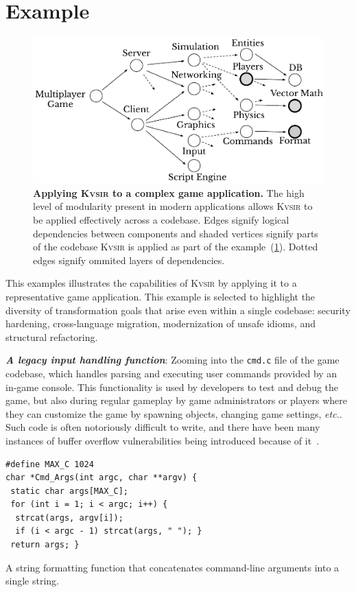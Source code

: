\documentclass[sigplan,review,anonymous,10pt]{acmart}
\def\etc{{\em etc.}\xspace}
\newcommand{\sys}{{\scshape Kv{\textalpha}sir}\xspace}
\newcommand{\heading}[1]{\vspace{2pt}\noindent\textbf{\emph{#1}}:\enspace}
\newcommand{\ttt}[1]{\texttt{#1}\xspace}
\begin{document}
\section{Example}
\label{sec:example}

\begin{figure}[t]
\centering
  \includegraphics[width=.9\columnwidth]{figs/kvasir_application.pdf}
  \caption{\textbf{Applying \sys to a complex game application.}
  The high level of modularity present in modern applications allows \sys to be applied effectively across a codebase.
  Edges signify logical dependencies between components 
  and shaded vertices signify parts of the codebase \sys is applied as part of the example~(\cref{sec:example}).
  Dotted edges signify ommited layers of dependencies.
  }
  \label{fig:ex-large-app}
\end{figure}

This examples illustrates the capabilities of \sys by applying it to a representative game
application.
This example is selected to highlight the
diversity of transformation goals that arise even within a single codebase:
security hardening, cross-language migration, modernization of unsafe idioms,
and structural refactoring.

\heading{A legacy input handling function}
Zooming into the \ttt{cmd.c} file of the game codebase, 
which handles parsing and executing user commands provided by an in-game console.
This functionality is used by developers to test and debug the game, but also during regular gameplay
by game administrators or players where they can customize the game by spawning objects, changing game settings, \etc.
Such code is often notoriously difficult to write,
and there have been many instances of buffer overflow vulnerabilities being introduced because of it~\cite{CVE-2006-3400, CVE-2006-3401, CVE-2007-5248, CVE-2019-1010043}.
\begin{listing}
\begin{verbatim}
#define MAX_C 1024
char *Cmd_Args(int argc, char **argv) {
 static char args[MAX_C];
 for (int i = 1; i < argc; i++) {
  strcat(args, argv[i]);
  if (i < argc - 1) strcat(args, " "); }
 return args; }
\end{verbatim}
\caption{A string formatting function that concatenates command-line arguments into a single string.}
\end{listing}
\end{document}
